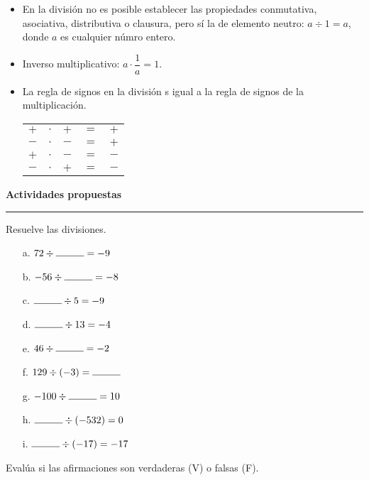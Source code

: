 \documentclass[spanish,letterpaper, 11pt, addpoints, answers]{exam}
\begin{document}
\begin{questions}
\begin{itemize}
    \item En la división no es posible establecer las propiedades conmutativa, asociativa, distributiva o clausura, pero sí la de elemento neutro: $a\div 1=a$, donde $a$ es cualquier númro entero.
    \item Inverso multiplicativo: $a\cdot \dfrac{1}{a}=1$.
    \item La regla de signos en la división s igual a la regla de signos de la multiplicación.
    \begin{center}
      \begin{tabular}{ccccc}
        $+$&$\cdot$&$+$&$=$&$+$\\
        $-$&$\cdot$&$-$&$=$&$+$\\
        $+$&$\cdot$&$-$&$=$&$-$\\
        $-$&$\cdot$&$+$&$=$&$-$\\
        
      \end{tabular}
    \end{center}
    
    
  \end{itemize}
  
  \parbox{6in}{
  \textbf{Actividades propuestas}}
  \vspace{0.15in}
  \hrule 

  \question Resuelve las divisiones.
  \begin{multicols}{3}
    \begin{itemize}
      \item[a.] $72\div \rule{1cm}{0.4pt}=-9$
      \item[b.] $-56\div \rule{1cm}{0.4pt}=-8$
      \item[c.] $\rule{1cm}{0.4pt}\div 5=-9$
      \item[d.] $\rule{1cm}{0.4pt}\div 13=-4$
      \item[e.] $46\div \rule{1cm}{0.4pt}=-2$
      \item[f.] $129\div (-3)=\rule{1cm}{0.4pt}$
      \item[g.] $-100\div \rule{1cm}{0.4pt}=10$
      \item[h.] $\rule{1cm}{0.4pt}\div (-532)=0$
      \item[i.] $\rule{1cm}{0.4pt}\div (-17)=-17$

   
    \end{itemize}
    
  \end{multicols}

  \question Evalúa si las afirmaciones son verdaderas (V) o falsas (F).


\end{questions}
\end{document}
